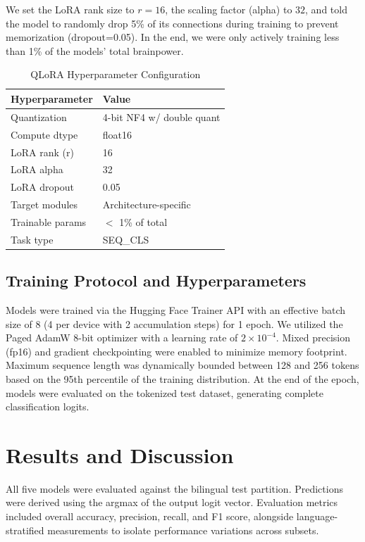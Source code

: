 \documentclass[journal]{IEEEtran}
\begin{document}
We set the LoRA rank size to $r=16$, the scaling factor (alpha) to $32$, and told the model to randomly drop 5\% of its connections during training to prevent memorization (dropout=0.05). In the end, we were only actively training less than 1\% of the models' total brainpower.

\begin{table}[htbp]
\caption{QLoRA Hyperparameter Configuration}
\label{tab:qlora}
\centering
\begin{tabular}{ll}
\toprule
\textbf{Hyperparameter} & \textbf{Value} \\
\midrule
Quantization & 4-bit NF4 w/ double quant \\
Compute dtype & float16 \\
LoRA rank (r) & 16 \\
LoRA alpha & 32 \\
LoRA dropout & 0.05 \\
Target modules & Architecture-specific \\
Trainable params & $<$ 1\% of total \\
Task type & SEQ\_CLS \\
\bottomrule
\end{tabular}
\end{table}

\subsection{Training Protocol and Hyperparameters}

Models were trained via the Hugging Face Trainer API with an effective batch size of 8 (4 per device with 2 accumulation steps) for 1 epoch. We utilized the Paged AdamW 8-bit optimizer with a learning rate of $2 \times 10^{-4}$. Mixed precision (fp16) and gradient checkpointing were enabled to minimize memory footprint. Maximum sequence length was dynamically bounded between 128 and 256 tokens based on the 95th percentile of the training distribution. At the end of the epoch, models were evaluated on the tokenized test dataset, generating complete classification logits.



\section{Results and Discussion}

All five models were evaluated against the bilingual test partition. Predictions were derived using the argmax of the output logit vector. Evaluation metrics included overall accuracy, precision, recall, and F1 score, alongside language-stratified measurements to isolate performance variations across subsets.
\end{document}
